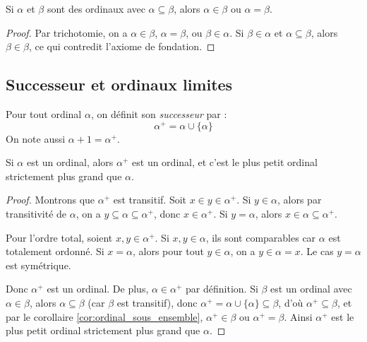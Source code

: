 \begin{corollaire}\label{cor:ordinal_sous_ensemble}
	Si $\alpha$ et $\beta$ sont des ordinaux avec $\alpha \subseteq \beta$, alors $\alpha \in \beta$ ou $\alpha = \beta$.
\end{corollaire}

\begin{proof}
	Par trichotomie, on a $\alpha \in \beta$, $\alpha = \beta$, ou $\beta \in \alpha$. Si $\beta \in \alpha$ et $\alpha \subseteq \beta$, alors $\beta \in \beta$, ce qui contredit l'axiome de fondation.
\end{proof}

\subsection{Successeur et ordinaux limites}


\begin{definition}[Successeur]
	Pour tout ordinal $\alpha$, on définit son \emph{successeur} par :
	$$\alpha^+ = \alpha \cup \{\alpha\}$$
	On note aussi $\alpha + 1 = \alpha^+$.
\end{definition}

\begin{proposition}\label{prop:successeur_ordinal}
	Si $\alpha$ est un ordinal, alors $\alpha^+$ est un ordinal, et c'est le plus petit ordinal strictement plus grand que $\alpha$.
\end{proposition}

\begin{proof}
	Montrons que $\alpha^+$ est transitif. Soit $x \in y \in \alpha^+$. Si $y \in \alpha$, alors par transitivité de $\alpha$, on a $y \subseteq \alpha \subseteq \alpha^+$, donc $x \in \alpha^+$. Si $y = \alpha$, alors $x \in \alpha \subseteq \alpha^+$.

	Pour l'ordre total, soient $x, y \in \alpha^+$. Si $x, y \in \alpha$, ils sont comparables car $\alpha$ est totalement ordonné. Si $x = \alpha$, alors pour tout $y \in \alpha$, on a $y \in \alpha = x$. Le cas $y = \alpha$ est symétrique.

	Donc $\alpha^+$ est un ordinal. De plus, $\alpha \in \alpha^+$ par définition. Si $\beta$ est un ordinal avec $\alpha \in \beta$, alors $\alpha \subseteq \beta$ (car $\beta$ est transitif), donc $\alpha^+ = \alpha \cup \{\alpha\} \subseteq \beta$, d'où $\alpha^+ \subseteq \beta$, et par le corollaire \ref{cor:ordinal_sous_ensemble}, $\alpha^+ \in \beta$ ou $\alpha^+ = \beta$. Ainsi $\alpha^+$ est le plus petit ordinal strictement plus grand que $\alpha$.
\end{proof}

